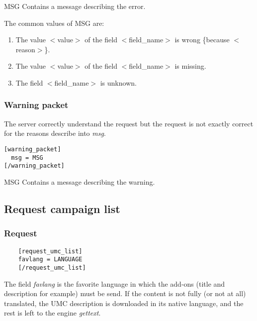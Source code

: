 \begin{description}
 \item MSG Contains a message describing the error.
\end{description}

The common values of MSG are:

\begin{enumerate}
 \item The value $<$value$>$ of the field $<$field\_name$>$ is wrong \{because $<$reason$>$\}.
 \item The value $<$value$>$ of the field $<$field\_name$>$ is missing.
 \item The field $<$field\_name$>$ is unknown.
\end{enumerate}

\subsubsection{Warning packet}
\label{wire:specialpackets:warningpacket}

The server correctly understand the request but the request is not exactly correct for the reasons describe into \textit{msg}.
\begin{lstlisting}
[warning_packet]
  msg = MSG
[/warning_packet]
\end{lstlisting}

\begin{description}
 \item MSG Contains a message describing the warning.
\end{description}

\subsection{Request campaign list}
\label{wire:request_campaign_list}

\subsubsection{Request}
\begin{lstlisting}
	[request_umc_list]
    favlang = LANGUAGE
	[/request_umc_list]
\end{lstlisting}

The field \textit{favlang} is the favorite language in which the add-ons (title and description for example) must be send. 
If the content is not fully (or not at all) translated,  the UMC description is downloaded in its native language, 
and the rest is left to the engine \textit{gettext}.
\newline
